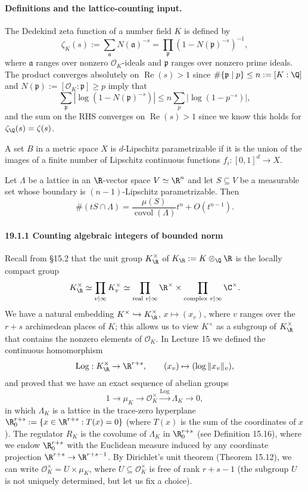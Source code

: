 \paragraph{Definitions and the lattice-counting input.}
The Dedekind zeta function of a number field $K$ is defined by
\[
\zeta_K(s):=\sum_{\mathfrak a}N(\mathfrak a)^{-s}
=\prod_{\mathfrak p}(1-N(\mathfrak p)^{-s})^{-1},
\]
where $\mathfrak a$ ranges over nonzero $\mathcal O_K$-ideals and $\mathfrak p$ ranges over nonzero prime ideals. The product converges absolutely on $\operatorname{Re}(s)>1$ since $\#\{\mathfrak p\mid p\}\leq n:=[K:\Q]$ and $N(\mathfrak p):=[\mathcal O_K:\mathfrak p]\geq p$ imply that
\[
\sum_{\mathfrak p}|\log(1-N(\mathfrak p)^{-s})|\leq n\sum_p|\log(1-p^{-s})|,
\]
and the sum on the RHS converges on $\operatorname{Re}(s)>1$ since we know this holds for $\zeta_\Q(s)=\zeta(s)$.
\begin{definition}[19.4]
A set $B$ in a metric space $X$ is $d$-Lipschitz parametrizable if it is the union of the images of a finite number of Lipschitz continuous functions $f_i:[0,1]^d\to X$.
\end{definition}
\begin{corollary}
Let $\Lambda$ be a lattice in an $\R$-vector space $V\simeq\R^n$ and let $S\subseteq V$ be a measurable set whose boundary is $(n-1)$-Lipschitz parametrizable. Then
\[
\#(tS\cap\Lambda)=\frac{\mu(S)}{\operatorname{covol}(\Lambda)}t^n+O(t^{n-1}).
\]
\end{corollary}
\paragraph{19.1.1 Counting algebraic integers of bounded norm}
Recall from \S15.2 that the unit group $K_\R^\times$ of $K_\R:=K\otimes_\Q\R$ is the locally compact group
\[
K_\R^\times\simeq\prod_{v\mid\infty}K_v^\times\simeq\prod_{\text{real }v\mid\infty}\R^\times\times\prod_{\text{complex }v\mid\infty}\C^\times.
\]
We have a natural embedding $K^\times\hookrightarrow K_\R^\times$, $x\mapsto(x_v)$, where $v$ ranges over the $r+s$ archimedean places of $K$; this allows us to view $K^\times$ as a subgroup of $K_\R^\times$ that contains the nonzero elements of $\mathcal O_K$. In Lecture 15 we defined the continuous homomorphism
\[
\operatorname{Log}:K_\R^\times\to\R^{r+s},\qquad (x_v)\mapsto(\log\|x_v\|_v),
\]
and proved that we have an exact sequence of abelian groups
\[
1\longrightarrow\mu_K\longrightarrow\mathcal O_K^\times\xrightarrow{\operatorname{Log}}\Lambda_K\longrightarrow0,
\]
in which $\Lambda_K$ is a lattice in the trace-zero hyperplane $\R^{r+s}_0:=\{x\in\R^{r+s}:T(x)=0\}$ (where $T(x)$ is the sum of the coordinates of $x$). The regulator $R_K$ is the covolume of $\Lambda_K$ in $\R^{r+s}_0$ (see Definition 15.16), where we endow $\R^{r+s}_0$ with the Euclidean measure induced by any coordinate projection $\R^{r+s}\to\R^{r+s-1}$. By Dirichlet's unit theorem (Theorem 15.12), we can write $\mathcal O_K^\times=U\times\mu_K$, where $U\subseteq\mathcal O_K^\times$ is free of rank $r+s-1$ (the subgroup $U$ is not uniquely determined, but let us fix a choice).

